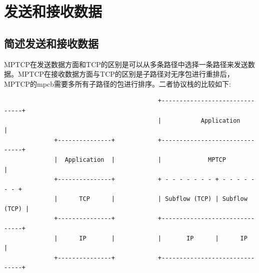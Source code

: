 \section{发送和接收数据}
\subsection{简述发送和接收数据}
MPTCP在发送数据方面和TCP的区别是可以从多条路径中选择一条路径来发送数据。MPTCP在接收数据方面与TCP的区别是子路径对无序包进行重排后，MPTCP的mpcb需要多所有子路径的包进行排序。二者协议栈的比较如下:
\small\begin{verbatim}
                                           +-------------------------------+
                                           |           Application         |
              +---------------+            +-------------------------------+
              |  Application  |            |             MPTCP             |
              +---------------+            + - - - - - - - + - - - - - - - +
              |      TCP      |            | Subflow (TCP) | Subflow (TCP) |
              +---------------+            +-------------------------------+
              |      IP       |            |       IP      |      IP       |
              +---------------+            +-------------------------------+
\end{verbatim}\normalsize


